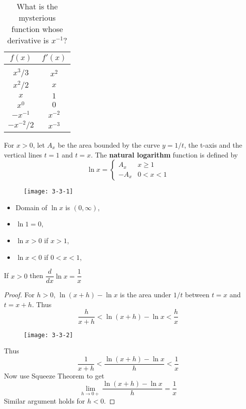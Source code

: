 \documentclass[../main.tex]{subfiles}
\begin{document}
  \begin{table}[H]
    \centering
    \begin{tabular}{c|c}
      $f(x)$ & $f'(x)$ \\
      \hline
      & \\
      $x^3/3$ & $x^2$ \\
      $x^2/2$ & $x$ \\
      $x$ & $1$ \\
      $x^0$ & $0$ \\
      $-x^{-1}$ & $x^{-2}$ \\
      $-x^{-2}/2$ & $x^{-3}$
    \end{tabular}
    \caption{What is the mysterious function whose derivative is $x^{-1}$?}
  \end{table}

  \begin{definition}
    For $x>0$, let $A_x$ be the area bounded by the curve $y = 1/t$, the t-axis and the vertical lines $t=1$ and $t=x$. The \textbf{natural logarithm} function is defined by
    \[
      \ln x =
      \begin{cases}
        A_x & x \geq 1 \\
        -A_x & 0 < x < 1
      \end{cases}
    \]
  \end{definition}
  \begin{figure}[H]
    \centering
    
  \end{figure}

  \begin{figure}[H]
    \centering
    \texttt{[image: 3-3-1]}
  \end{figure}


  \begin{multicols}{2}
    \begin{itemize}
      \item Domain of $\ln x$ is $(0, \infty)$,
      \item $\ln 1 = 0$,
      \item $\ln x >0$ if $x>1$,
      \item $\ln x < 0$ if $0<x<1$,
    \end{itemize}
  \end{multicols}

  \begin{theorem}
    If $x>0$ then $\dfrac{d}{dx} \ln x = \dfrac{1}{x}$
  \end{theorem}

  \begin{proof}
    For $h >0$, $\ln(x+h) - \ln x$ is the area under $1/t$ between $t = x$ and $t = x+h$. Thus
    \[
      \frac{h}{x+h} < \ln(x+h) - \ln x < \frac{h}{x}
    \]
    \begin{figure}[H]
      \centering
      \texttt{[image: 3-3-2]}
      \label{fig:ddxln}
    \end{figure}
    Thus
    \[
      \frac{1}{x+h} < \frac{\ln(x+h) - \ln x}{h} < \frac{1}{x}
    \]
    Now use Squeeze Theorem to get
    \[
      \lim_{h \to 0+} \frac{\ln(x+h) - \ln x}{h} = \frac{1}{x}
    \]
    Similar argument holds for $h<0$.

  \end{proof}
\end{document}
